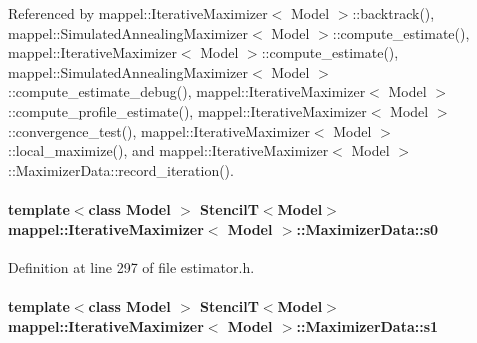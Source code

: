 Referenced by mappel\+::\+Iterative\+Maximizer$<$ Model $>$\+::backtrack(), mappel\+::\+Simulated\+Annealing\+Maximizer$<$ Model $>$\+::compute\+\_\+estimate(), mappel\+::\+Iterative\+Maximizer$<$ Model $>$\+::compute\+\_\+estimate(), mappel\+::\+Simulated\+Annealing\+Maximizer$<$ Model $>$\+::compute\+\_\+estimate\+\_\+debug(), mappel\+::\+Iterative\+Maximizer$<$ Model $>$\+::compute\+\_\+profile\+\_\+estimate(), mappel\+::\+Iterative\+Maximizer$<$ Model $>$\+::convergence\+\_\+test(), mappel\+::\+Iterative\+Maximizer$<$ Model $>$\+::local\+\_\+maximize(), and mappel\+::\+Iterative\+Maximizer$<$ Model $>$\+::\+Maximizer\+Data\+::record\+\_\+iteration().

\paragraph[{\texorpdfstring{s0}{s0}}]{\setlength{\rightskip}{0pt plus 5cm}template$<$class Model $>$ {\bf StencilT}$<$Model$>$ {\bf mappel\+::\+Iterative\+Maximizer}$<$ Model $>$\+::Maximizer\+Data\+::s0\hspace{0.3cm}{\ttfamily [protected]}}\hypertarget{classmappel_1_1IterativeMaximizer_1_1MaximizerData_a1a3b8f9693e769eded9fe76751fa49c1}{}\label{classmappel_1_1IterativeMaximizer_1_1MaximizerData_a1a3b8f9693e769eded9fe76751fa49c1}


Definition at line 297 of file estimator.\+h.

\paragraph[{\texorpdfstring{s1}{s1}}]{\setlength{\rightskip}{0pt plus 5cm}template$<$class Model $>$ {\bf StencilT}$<$Model$>$ {\bf mappel\+::\+Iterative\+Maximizer}$<$ Model $>$\+::Maximizer\+Data\+::s1\hspace{0.3cm}{\ttfamily [protected]}}\hypertarget{classmappel_1_1IterativeMaximizer_1_1MaximizerData_a3c0f6ec4ba531dfefe8e4b73f537192d}{}\label{classmappel_1_1IterativeMaximizer_1_1MaximizerData_a3c0f6ec4ba531dfefe8e4b73f537192d}


